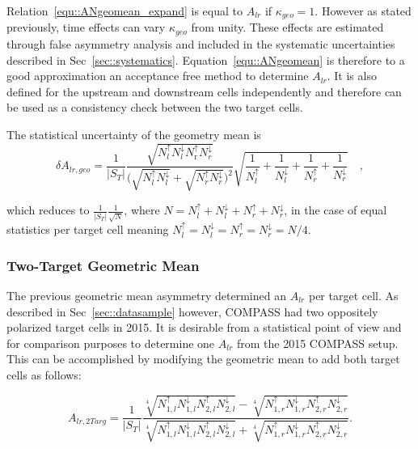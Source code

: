 Relation~\ref{equ::ANgeomean_expand} is equal to $A_{lr}$ if $\kappa_{geo} = 1$.
However as stated previously, time effects can vary $\kappa_{geo}$ from
unity. These effects are estimated through false asymmetry analysis and included
in the systematic uncertainties described in Sec~\ref{sec::systematics}.
Equation~\ref{equ::ANgeomean} is therefore to a good approximation an acceptance
free method to determine $A_{lr}$.  It is also defined for the upstream and
downstream cells independently and therefore can be used as a consistency check
between the two target cells.

The statistical uncertainty of the geometry mean is
\begin{equation}
  \delta A_{lr,geo} = \frac{1}{|S_T|}
  \frac{
    \sqrt{
      N_{l}^{\uparrow}N_{l}^{\downarrow}
      N_{\mathrm{r}}^{\uparrow}N_{r}^{\downarrow}
    }
  }{
    \Big( \sqrt{N_{l}^{\uparrow}N_{l}^{\downarrow}} +
    \sqrt{N_{r}^{\uparrow}N_{r}^{\downarrow}} \Big)^2
  }
  \sqrt{
    \frac{1}{N_{l}^{\uparrow}} +
    \frac{1}{N_{l}^{\downarrow}} +
    \frac{1}{N_{r}^{\uparrow}} +
    \frac{1}{N_{r}^{\downarrow}}
  } \quad,
\end{equation}

\noindent
which reduces to $\frac{1}{|S_T|}\frac{1}{\sqrt{N}}$, where $N = N^\uparrow_l +
N^\downarrow_l + N^\uparrow_r + N^\downarrow_r$, in the case of equal statistics
per target cell meaning $N^\uparrow_l = N^\downarrow_l = N^\uparrow_r =
N^\downarrow_r = N/4$.

\subsubsection{Two-Target Geometric Mean} \label{sec::TwoTargGeoMean}
The previous geometric mean asymmetry determined an $A_{lr}$ per target cell.
As described in Sec~\ref{sec::datasample} however, COMPASS had two oppositely
polarized target cells in 2015.  It is desirable from a statistical point of
view and for comparison purposes to determine one $A_{lr}$ from the 2015 COMPASS
setup.  This can be accomplished by modifying the geometric mean to add both
target cells as follows:

\begin{equation}
  \label{equ::AN4TargGeomean}
  A_{lr,2Targ} =
  \frac{1}{|S_T|}
  \frac{ \sqrt[4]{ N_{1,l}^\uparrow N_{1, l}^\downarrow
      N_{2,l}^\uparrow N_{2, l}^\downarrow }
    - \sqrt[4]{ N_{1,r}^\uparrow N_{1,r}^\downarrow
      N_{2,r}^\uparrow N_{2,r}^\downarrow }
  }{
    \sqrt[4]{ N_{1,l}^\uparrow N_{1, l}^\downarrow
      N_{2,l}^\uparrow N_{2, l}^\downarrow }
    + \sqrt[4]{ N_{1,r}^\uparrow N_{1,r}^\downarrow
      N_{2,r}^\uparrow N_{2,r}^\downarrow } }.
\end{equation}

